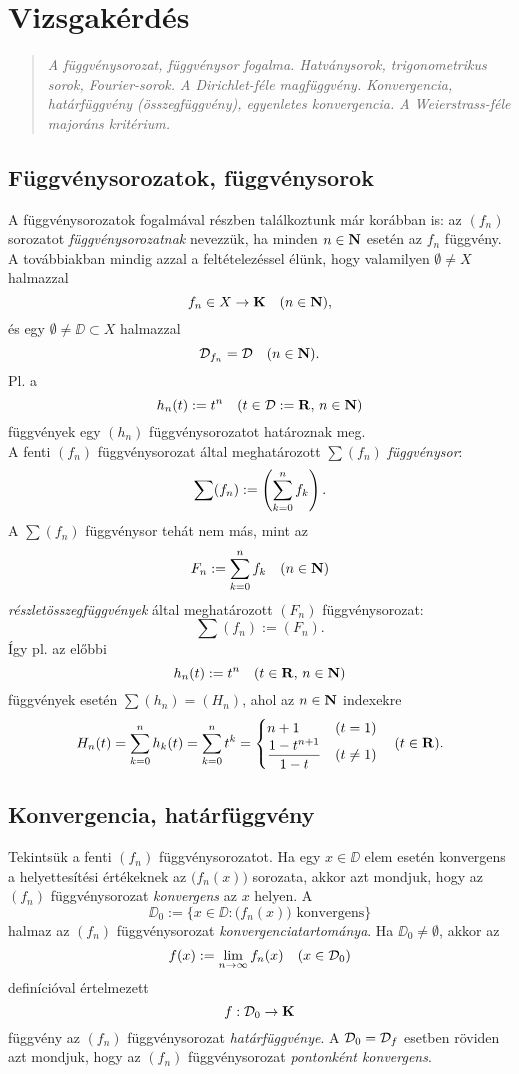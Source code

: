 \newpage
\section{Vizsgakérdés}
\begin{quote}
	\textit{A függvénysorozat, függvénysor fogalma. Hatványsorok, trigonometrikus sorok, Fourier-sorok. A Dirichlet-féle magfüggvény. Konvergencia, határfüggvény (összegfüggvény), egyenletes konvergencia. A Weierstrass-féle majoráns kritérium.}
\end{quote}

\subsection{Függvénysorozatok, függvénysorok}

A függvénysorozatok fogalmával részben találkoztunk már korábban is: az $(f_n)$ sorozatot \textit{függvénysorozatnak} nevezzük, ha minden $n \in \mathbf{N}$ esetén az $f_n$ függvény. A továbbiakban mindig azzal a feltételezéssel élünk, hogy valamilyen $\emptyset \neq X$ halmazzal
\[
	f_n \in X \to \mathbf{K} \quad (n \in \mathbf{N}),
\]
és egy $\emptyset \neq \DD \subset X$ halmazzal
\[
	\mathcal{D}_{f_n} = \mathcal{D} \quad (n \in \mathbf{N}).
\]
Pl. a
\[
	h_n(t) := t^n \quad (t \in \mathcal{D} := \mathbf{R}, \, n \in \mathbf{N})
\]
függvények egy $(h_n)$ függvénysorozatot határoznak meg.\\

A fenti $(f_n)$ függvénysorozat által meghatározott $\sum(f_n)$ \textit{függvénysor}:
\[
	\sum(f_n) := \left( \sum_{k=0}^n f_k \right).
\]
A $\sum(f_n)$ függvénysor tehát nem más, mint az
\[
	F_n := \sum_{k=0}^n f_k \quad (n \in \mathbf{N})
\]
\textit{részletösszegfüggvények} által meghatározott $(F_n)$ függvénysorozat:
\[
	\sum(f_n) := (F_n).
\]
Így pl. az előbbi
\[
	h_n(t) := t^n \quad (t \in \mathbf{R}, \, n \in \mathbf{N})
\]
függvények esetén $\sum(h_n) = (H_n)$, ahol az $n \in \mathbf{N}$ indexekre
\[
	H_n(t) = \sum_{k=0}^n h_k(t) = \sum_{k=0}^n t^k = \begin{cases}
		n + 1 & (t = 1) \\
		\displaystyle \frac{1-t^{n+1}}{1-t} & (t \neq 1)
	\end{cases} \quad (t \in \mathbf{R}).
\]

\subsection{Konvergencia, határfüggvény}

Tekintsük a fenti $(f_n)$ függvénysorozatot. Ha egy $x \in \DD$ elem esetén konvergens a helyettesítési értékeknek az $\big(f_n(x)\big)$ sorozata, akkor azt mondjuk, hogy az $(f_n)$ függvénysorozat \textit{konvergens} az $x$ helyen. A
\[
	\DD_0 := \big\{ x \in \DD : \big(f_n(x)\big) \text{ konvergens} \big\}
\]
halmaz az $(f_n)$ függvénysorozat \textit{konvergenciatartománya}. Ha $\DD_0 \neq \emptyset$, akkor az
\[
	f(x) := \lim_{n \to \infty} f_n(x) \quad (x \in \mathcal{D}_0)
\]
definícióval értelmezett
\[
	f : \mathcal{D}_0 \to \mathbf{K}
\]
függvény az $(f_n)$ függvénysorozat \textit{határfüggvénye}. A $\mathcal{D}_0 = \mathcal{D}_f$ esetben röviden azt mondjuk, hogy az $(f_n)$ függvénysorozat \textit{pontonként konvergens}.\\

